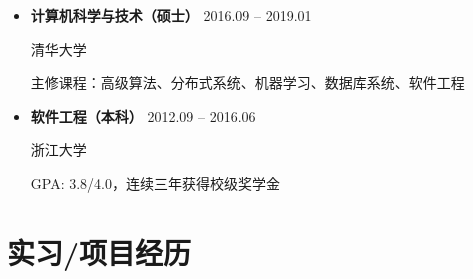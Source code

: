 \documentclass[11pt,a4paper]{article}
\begin{document}
\begin{itemize}
    \item \textbf{计算机科学与技术（硕士）} \hfill 2016.09 -- 2019.01

    \textcolor{primarycolor}{清华大学}

    \vspace{0.05em}

    主修课程：高级算法、分布式系统、机器学习、数据库系统、软件工程

    \vspace{0.15em}

    \item \textbf{软件工程（本科）} \hfill 2012.09 -- 2016.06

    \textcolor{primarycolor}{浙江大学}

    \vspace{0.05em}

    GPA: 3.8/4.0，连续三年获得校级奖学金
\end{itemize}

\section*{\faBriefcase\quad 实习/项目经历}
\end{document}

